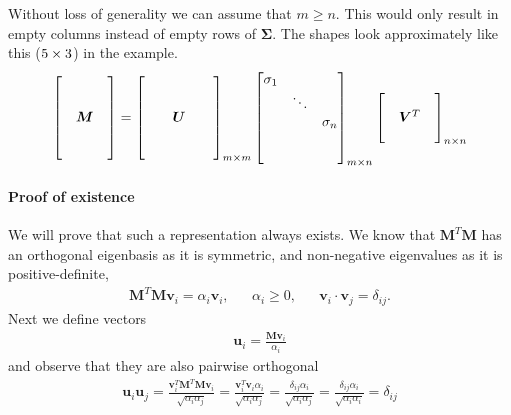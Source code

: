     Without loss of generality we can assume that $m \geq n$. This would only result in empty columns instead of empty rows of $\bm{\Sigma}$.
    The shapes look approximately like this ($5 \times 3$) in the example.
    \begin{align}
        \begin{bmatrix}
        &        & \\
        &        & \\
        & \bm{M} & \\
        &        & \\
        &        & 
        \end{bmatrix}    = 
        \begin{bmatrix}
        & &        & & \\
        & &        & & \\
        & & \bm{U} & & \\
        & &        & & \\
        & &        & & 
        \end{bmatrix}_{m \times m}
        \begin{bmatrix}
        \sigma_1 &        &          \\
                 & \ddots &          \\
                 &        & \sigma_n \\
                 &        &          \\
                 &        &          
        \end{bmatrix}_{m \times n}
        \begin{bmatrix}
            &          & \\
            & \bm{V}^T & \\
            &          &  
        \end{bmatrix}_{n \times n}
    \end{align}
    
    \paragraph{Proof of existence}
    We will prove that such a representation always exists.
    We know that $\bm{M}^T \bm{M}$ has an orthogonal eigenbasis as it is symmetric, and non-negative eigenvalues as it is positive-definite,
    \begin{align}
        \bm{M}^T \bm{M} \bm{v}_i = \alpha_i \bm{v}_i, && \alpha_i \geq 0, &&  \bm{v}_i \cdot \bm{v}_j = \delta_{ij}.
    \end{align}
    Next we define vectors 
    \begin{align}
    \bm{u}_i = \frac{\bm{Mv}_i}{\alpha_i}    
    \end{align}
    and observe that they are also pairwise orthogonal
    \begin{align}
        \bm{u}_i \bm{u}_j = \frac{\bm{v}_i^T \bm{M}^T \bm{Mv}_i}{\sqrt{\alpha_i \alpha_j}} = \frac{\bm{v}_i^T \bm{v}_i \alpha_i}{{\sqrt{\alpha_i \alpha_j}}} = 
        \frac{\delta_{ij} \alpha_i}{{\sqrt{\alpha_i \alpha_j}}} = 
        \frac{\delta_{ij} \alpha_i}{{\sqrt{\alpha_i \alpha_i}}} = \delta_{ij}
    \end{align}
    
